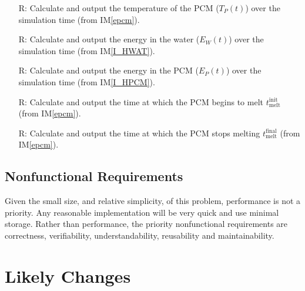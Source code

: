 \documentclass[12pt]{article}
\newcommand{\iref}[1]{IM\ref{#1}}
\newcounter{reqnum} %
\begin{document}
\begin{itemize}
\item[R\refstepcounter{reqnum}\thereqnum \label{R_TempPCM}:] Calculate and
  output the temperature of the PCM ($T_P(t)$) over the simulation time (from
  \iref{epcm}).

\item[R\refstepcounter{reqnum}\thereqnum \label{R_EnergyWater}:] Calculate and
  output the energy in the water ($E_W(t)$) over the simulation time (from
  \iref{I_HWAT}).

\item[R\refstepcounter{reqnum}\thereqnum \label{R_EnergyPCM}:] Calculate and
  output the energy in the PCM ($E_P(t)$) over the simulation time (from
  \iref{I_HPCM}).

\item[R\refstepcounter{reqnum}\thereqnum \label{R_timeMeltBegin}:] Calculate and
  output the time at which the PCM begins to melt $t_\text{melt}^\text{init}$
  (from \iref{epcm}).

\item[R\refstepcounter{reqnum}\thereqnum \label{R_timeMeltEnd}:] Calculate and
  output the time at which the PCM stops melting $t_\text{melt}^\text{final}$
  (from \iref{epcm}).

\end{itemize}

\subsection{Nonfunctional Requirements}

Given the small size, and relative simplicity, of this problem, performance is
not a priority.  Any reasonable implementation will be very quick and use
minimal storage.  Rather than performance, the priority nonfunctional
requirements are correctness, verifiability, understandability, reusability and
maintainability.

\section{Likely Changes}    
\end{document}
